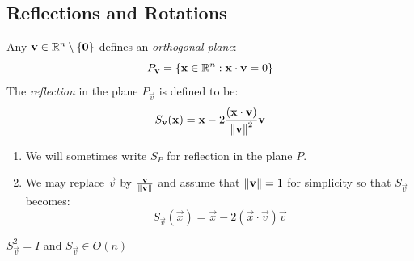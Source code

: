 \documentclass[../main.tex]{subfiles}
\begin{document}
\subsection{Reflections and Rotations}
\begin{definition}[Reflections]
  Any $\mathbf{\bm{v}} \in \mathbb{R}^{n} \setminus \{\mathbf{\bm{0}}\}$ defines an \textit{orthogonal plane}:
  \[
    P_{\mathbf{\bm{v}}} = \{\mathbf{\bm{x}} \in \mathbb{R}^{n}: \mathbf{\bm{x}} \cdot \mathbf{\bm{v}} = 0\}
  \]
  The \textit{reflection} in the plane $P_{\vec{v}}$ is defined to be:
  \[
    S_{\mathbf{\bm{v}}}(\mathbf{\bm{x}}) = \mathbf{\bm{x}} - 2 \frac{(\mathbf{\bm{x}} \cdot \mathbf{\bm{v}})}{\left\lVert \mathbf{\bm{v}} \right\rVert^2} \mathbf{\bm{v}}
  \]
\end{definition}
\begin{remark}[Remarks]
  \begin{enumerate}
    \item We will sometimes write $S_P$ for reflection in the plane $P$.
    \item We may replace $\vec{v}$ by $\frac{\mathbf{\bm{v}}}{\left\lVert \mathbf{\bm{v}} \right\rVert}$ and assume that $\left\lVert \mathbf{\bm{v}} \right\rVert = 1$ for simplicity so that $S_{\vec{v}}$ becomes:
      \[
        S_{\vec{v}}(\vec{x}) = \vec{x} - 2(\vec{x} \cdot \vec{v})\vec{v}
      \]
  \end{enumerate}
\end{remark}
\begin{lemma}
  $S^2_{\vec{v}} = I$ and $S_{\vec{v}} \in O(n)$
\end{lemma}
\end{document}
